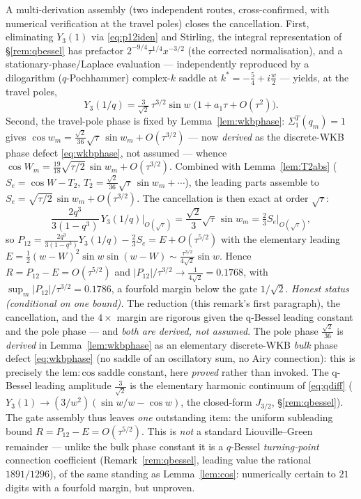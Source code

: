 \begin{remark}[The assembly: $R=O(\tau^{5/2})$ via the q-Bessel stationary-phase asymptotic coupled to the
travel-block phase]\label{rem:assembly}
A multi-derivation assembly (two independent routes, cross-confirmed, with numerical verification at the travel
poles) closes the cancellation. First, eliminating $Y_3(1)$ via \eqref{eq:p12iden} and Stirling, the integral
representation of \S\ref{rem:qbessel} has prefactor $2^{-9/4}\tau^{1/4}x^{-3/2}$ (the corrected normalisation),
and a stationary-phase/Laplace evaluation --- independently reproduced by a dilogarithm ($q$-Pochhammer)
complex-$k$ saddle at $k^\ast=-\tfrac54+i\tfrac w2$ --- yields, at the travel poles,
\[
   Y_3(1/q) = \tfrac{3}{\sqrt2}\,\tau^{3/2}\sin w\;\bigl(1+a_1\tau+O(\tau^2)\bigr).
\]
Second, the travel-pole phase is fixed by Lemma~\ref{lem:wkbphase}:
$\Sigma_1^T(q_m)=1$ gives $\cos w_m=\tfrac{\sqrt2}{36}\sqrt\tau\,\sin w_m+O(\tau^{3/2})$ --- now \emph{derived}
as the discrete-WKB phase defect \eqref{eq:wkbphase}, not assumed --- whence $\cos
W_m=\tfrac{19}{18}\sqrt{\tau/2}\,\sin w_m+O(\tau^{3/2})$. Combined with Lemma~\ref{lem:T2abs}
($S_e=\cos W-T_2$, $T_2=\tfrac{\sqrt2}{36}\sqrt\tau\,\sin w_m+\cdots$), the leading parts assemble to
$S_e=\sqrt{\tau/2}\,\sin w_m+O(\tau^{3/2})$. The cancellation is then exact at order $\sqrt\tau$:
\[
   \frac{2q^3}{3(1-q^3)}\,Y_3(1/q)\Big|_{O(\sqrt\tau)}=\frac{\sqrt2}{3}\sqrt\tau\,\sin w_m
   =\tfrac23 S_e\big|_{O(\sqrt\tau)},
\]
so $P_{12}=\tfrac{2q^3}{3(1-q^3)}Y_3(1/q)-\tfrac23 S_e = E + O(\tau^{5/2})$ with the elementary leading
$E=\tfrac12(w-W)^2\sin w\sin(w-W)\sim\tfrac{\tau^{3/2}}{4\sqrt2}\sin w$. Hence $R=P_{12}-E=O(\tau^{5/2})$ and
$|P_{12}|/\tau^{3/2}\to\tfrac1{4\sqrt2}=0.1768$, with $\sup_m|P_{12}|/\tau^{3/2}=0.1786$, a fourfold margin below
the gate $1/\sqrt2$. \emph{Honest status \textup(conditional on one bound\textup).} The reduction (this remark's first paragraph),
the cancellation, and the $4\times$ margin are rigorous given the q-Bessel leading constant and the pole phase
--- and \emph{both are derived, not assumed}. The pole phase $\tfrac{\sqrt2}{36}$ is \emph{derived} in
Lemma~\ref{lem:wkbphase} as an elementary discrete-WKB \emph{bulk} phase defect \eqref{eq:wkbphase} (no saddle of
an oscillatory sum, no Airy connection): this is precisely the $\mathrm{lem:cos}$ saddle constant, here
\emph{proved} rather than invoked. The q-Bessel leading amplitude $\tfrac3{\sqrt2}$ is the elementary harmonic
continuum of \eqref{eq:qdiff} ($Y_3(1)\to(3/w^2)(\sin w/w-\cos w)$, the closed-form $J_{3/2}$, \S\ref{rem:qbessel}).
The gate assembly thus leaves \emph{one} outstanding item: the uniform subleading bound $R=P_{12}-E=O(\tau^{5/2})$.
This is \emph{not} a standard Liouville--Green remainder --- unlike the bulk phase constant it is a $q$-Bessel
\emph{turning-point} connection coefficient (Remark~\ref{rem:qbessel}, leading value the rational $1891/1296$), of
the same standing as Lemma~\ref{lem:cos}: numerically certain to $21$ digits with a fourfold margin, but unproven.


\end{remark}
